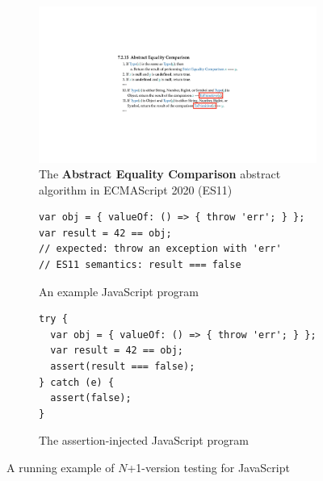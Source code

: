 \begin{figure}[t]
  \centering
  \begin{subfigure}[t]{0.48\textwidth}
    \includegraphics[width=\textwidth]{img/example-algo.pdf}
    \caption{The \textbf{Abstract Equality Comparison} abstract algorithm in
    ECMAScript 2020 (ES11)}
    \label{fig:example-algo}
  \end{subfigure}
  \begin{subfigure}[t]{0.43\textwidth}
    \begin{lstlisting}[style=myJSstyle]
var obj = { valueOf: () => { throw 'err'; } };
var result = 42 == obj;
// expected: throw an exception with 'err'
// ES11 semantics: result === false
    \end{lstlisting}
    \caption{An example JavaScript program}
    \label{fig:example-js}
  \end{subfigure}
  \begin{subfigure}[t]{0.45\textwidth}
    \begin{lstlisting}[style=myJSstyle]
try {
  var obj = { valueOf: () => { throw 'err'; } };
  var result = 42 == obj;
  assert(result === false);
} catch (e) {
  assert(false);
}
    \end{lstlisting}
    \caption{The assertion-injected JavaScript program}
    \label{fig:example-injected}
  \end{subfigure}
  \caption{A running example of $N$+1-version testing for JavaScript}
  \label{fig:example}
  \vspace*{-1em}
\end{figure}

